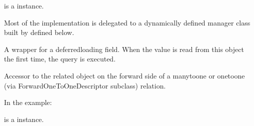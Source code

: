 \documentclass[letterpaper,10pt,english]{sphinxmanual}
\begin{document}
\begin{fulllineitems}
\begin{fulllineitems}
 is a  instance.

Most of the implementation is delegated to a dynamically defined manager
class built by  defined below.

\end{fulllineitems}


\begin{fulllineitems}
\label{\detokenize{forums:forums.models.Post.comment_count}}
A wrapper for a deferred\sphinxhyphen{}loading field. When the value is read from this
object the first time, the query is executed.

\end{fulllineitems}


\begin{fulllineitems}
\label{\detokenize{forums:forums.models.Post.forum}}
Accessor to the related object on the forward side of a many\sphinxhyphen{}to\sphinxhyphen{}one or
one\sphinxhyphen{}to\sphinxhyphen{}one (via ForwardOneToOneDescriptor subclass) relation.

In the example:

\begin{sphinxVerbatim}[commandchars=\\\{\}]
 
       
\end{sphinxVerbatim}

 is a  instance.

\end{fulllineitems}



\end{fulllineitems}
\end{document}
